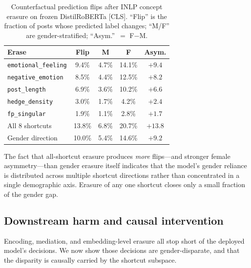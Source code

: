 \documentclass[11pt]{article}
\begin{document}
\begin{table}[t]
\centering
\small
\caption{Counterfactual prediction flips after INLP concept erasure on frozen DistilRoBERTa [CLS]. ``Flip'' is the fraction of posts whose predicted label changes; ``M/F'' are gender-stratified; ``Asym.''~$=$ F$-$M.}
\label{tab:erasure}
\begin{tabular}{lcccc}
\toprule
\textbf{Erase} & \textbf{Flip} & \textbf{M} & \textbf{F} & \textbf{Asym.} \\
\midrule
\texttt{emotional\_feeling}    &  9.4\% & 4.7\% & 14.1\% & $+9.4$ \\
\texttt{negative\_emotion}     &  8.5\% & 4.4\% & 12.5\% & $+8.2$ \\
\texttt{post\_length}          &  6.9\% & 3.6\% & 10.2\% & $+6.6$ \\
\texttt{hedge\_density}        &  3.0\% & 1.7\% &  4.2\% & $+2.4$ \\
\texttt{fp\_singular}          &  1.9\% & 1.1\% &  2.8\% & $+1.7$ \\
\midrule
All 8 shortcuts                & 13.8\% & 6.8\% & 20.7\% & $+13.8$ \\
Gender direction               & 10.0\% & 5.4\% & 14.6\% & $+9.2$ \\
\bottomrule
\end{tabular}
\end{table}

The fact that all-shortcut erasure produces \emph{more} flips---and stronger female asymmetry---than gender erasure itself indicates that the model's gender reliance is distributed across multiple shortcut directions rather than concentrated in a single demographic axis. Erasure of any one shortcut closes only a small fraction of the gender gap.

\subsection{Downstream harm and causal intervention}
\label{sec:harm}

Encoding, mediation, and embedding-level erasure all stop short of the deployed model's decisions. We now show those decisions are gender-disparate, and that the disparity is causally carried by the shortcut subspace.
\end{document}
